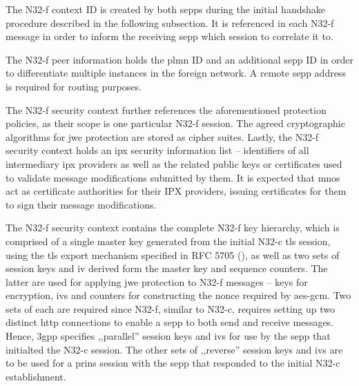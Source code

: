 The N32-f context ID is created by both \glspl{sepp} during the initial handshake procedure described in the following subsection.
It is referenced in each N32-f message in order to inform the receiving \gls{sepp} which session to correlate it to.

The N32-f peer information holds the \gls{plmn} ID and an additional \gls{sepp} ID in order to differentiate multiple instances in the foreign network.
A remote \gls{sepp} address is required for routing purposes.

The N32-f security context further references the aforementioned protection policies, as their scope is one particular N32-f session.
The agreed cryptographic algorithms for \gls{jwe} protection are stored as cipher suites.
Lastly, the N32-f security context holds an \gls{ipx} security information list -- identifiers of all intermediary \gls{ipx} providers as well as the related  public keys or certificates used to validate message modifications submitted by them.
It is expected that \glspl{mno} act as certificate authorities for their IPX providers, issuing certificates for them to sign their message modifications.

The N32-f security context contains the complete N32-f key hierarchy, which is comprised of a single master key generated from the initial N32-c \gls{tls} session, using the \gls{tls} export mechanism specified in RFC 5705 (\cite{rfc5705}), as well as two sets of session keys and \gls{iv} derived form the master key and sequence counters.
The latter are used for applying \gls{jwe} protection to N32-f messages -- keys for encryption, \glspl{iv} and counters for constructing the nonce required by \gls{aes}-\gls{gcm}.
Two sets of each are required since N32-f, similar to N32-c, requires setting up two distinct \gls{http} connections to enable a \gls{sepp} to both send and receive messages.
Hence, \gls{3gpp} specifies ,,parallel'' session keys and \glspl{iv} for use by the \gls{sepp} that initialted the N32-c session.
The other sets of ,,reverse'' session keys and \glspl{iv} are to be used for a \gls{prins} session with the \gls{sepp} that responded to the initial N32-c establishment.
\\

